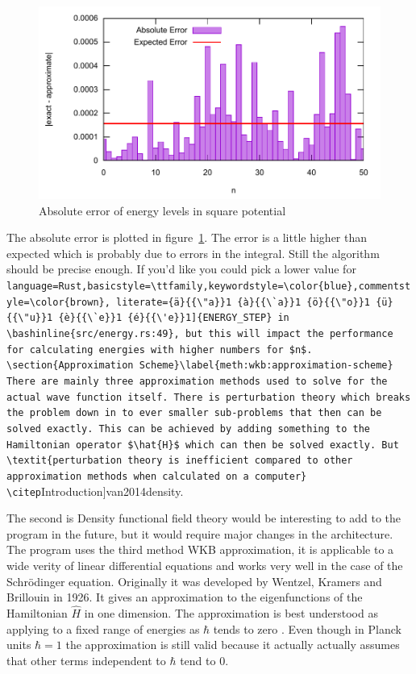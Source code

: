 \documentclass[11pt,DIV=10,final]{scrreprt} %
\providecommand{\rustinline}{\lstinline[language=Rust,basicstyle=\ttfamily,keywordstyle=\color{blue},commentstyle=\color{brown}, literate={ä}{{\"a}}1 {à}{{\`a}}1 {ö}{{\"o}}1 {ü}{{\"u}}1 {è}{{\`e}}1 {é}{{\'e}}1]} % für Inline-C++ Code
\providecommand{\bashinline}{\lstinline[language=bash,basicstyle=\ttfamily,keywordstyle=\color{blue},commentstyle=\color{brown}, literate={ä}{{\"a}}1 {à}{{\`a}}1 {ö}{{\"o}}1 {ü}{{\"u}}1 {è}{{\`e}}1 {é}{{\'e}}1]} % für Inline-C++ Code
\begin{document}
\begin{figure}[H]
  \centering
  \includegraphics[width=\textwidth]{plots/energy_error.pdf}
  \caption{Absolute error of energy levels in square potential}\label{fig:energy-error}
\end{figure}
The absolute error is plotted in figure~\ref{fig:energy-error}. The error is a little higher than expected which is probably due to errors in the integral. Still the algorithm should be precise
enough. If you'd like you could pick a lower value for \rustinline{ENERGY_STEP} in \bashinline{src/energy.rs:49}, but this will impact the performance for calculating energies with higher numbers for $n$.

\section{Approximation Scheme}\label{meth:wkb:approximation-scheme}
There are mainly three approximation methods used to solve for the actual wave function itself. There is perturbation theory which breaks the problem down in to ever smaller sub-problems that then can be
solved exactly. This can be achieved by adding something to the Hamiltonian operator $\hat{H}$ which can then be solved exactly. But \textit{perturbation theory is inefficient compared to other approximation
methods when calculated on a computer} \citep[Introduction]{van2014density}.

The second is Density functional field theory would be interesting to add to the program in the future, but it would require major changes in the architecture.
\\

The program uses the third method WKB approximation, it is applicable to a wide verity of linear differential equations and works very well in the case of the Schrödinger equation.
Originally it was developed by Wentzel, Kramers and Brillouin in 1926. It gives an approximation to the eigenfunctions of the Hamiltonian $\hat{H}$ in one dimension. The approximation is best
understood as applying to a fixed range of energies as $\hbar$ tends to zero \citep[p.~305]{hall2013quantum}. Even though in Planck units $\hbar = 1$ the approximation is still valid because it actually
actually assumes that other terms independent to $\hbar$ tend to 0.
\\
\end{document}
